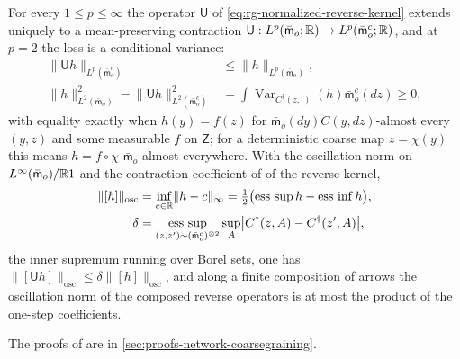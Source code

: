 For every $1\le p\le\infty$ the operator $\mathsf U$ of
\eqref{eq:rg-normalized-reverse-kernel} extends uniquely to a mean-preserving
contraction $\mathsf U:L^p(\bar{\mathsf m}_o;\mathbb R)\to L^p(\bar{\mathsf m}_o^c;\mathbb R)$,
and at $p=2$ the loss is a conditional variance:
\begin{align}
\lVert\mathsf Uh\rVert_{L^p(\bar{\mathsf m}_o^c)}&\le\lVert h\rVert_{L^p(\bar{\mathsf m}_o)},
\label{eq:rg-action-lp-contraction}\\
\lVert h\rVert_{L^2(\bar{\mathsf m}_o)}^2-\lVert\mathsf Uh\rVert_{L^2(\bar{\mathsf m}_o^c)}^2
&=\int\operatorname{Var}_{C^\dagger(z,\cdot)}(h)\bar{\mathsf m}_o^c(dz)\ge0,
\label{eq:rg-action-l2-conditional-defect}
\end{align}
with equality exactly when $h(y)=f(z)$ for $\bar{\mathsf m}_o(dy)C(y,dz)$-almost
every $(y,z)$ and some measurable $f$ on $\mathsf Z$; for a deterministic coarse
map $z=\chi(y)$ this means $h=f\circ\chi$ $\bar{\mathsf m}_o$-almost everywhere.
With the oscillation norm on $L^\infty(\bar{\mathsf m}_o)/\mathbb R1$ and the contraction
coefficient of \citet{Dobrushin1956} of the reverse kernel,
\begin{align}
\lVert[h]\rVert_{\mathrm{osc}}
&=\inf_{c\in\mathbb R}\lVert h-c\rVert_\infty
=\tfrac12\bigl(\operatorname*{ess~sup}h-\operatorname*{ess~inf}h\bigr),
\label{eq:rg-action-oscillation-norm}\\
\delta&=
\operatorname*{ess~sup}_{(z,z')\sim(\bar{\mathsf m}_o^c)^{\otimes2}}
\sup_{A}\bigl\lvert C^\dagger(z,A)-C^\dagger(z',A)\bigr\rvert,
\label{eq:rg-action-dobrushin-coefficient}
\end{align}
the inner supremum running over Borel sets, one has
$\lVert[\mathsf Uh]\rVert_{\mathrm{osc}}\le\delta\lVert[h]\rVert_{\mathrm{osc}}$, and
along a finite composition of arrows the oscillation norm of the composed reverse
operators is at most the product of the one-step coefficients.

The proofs of 
are in \cref{sec:proofs-network-coarsegraining}.


